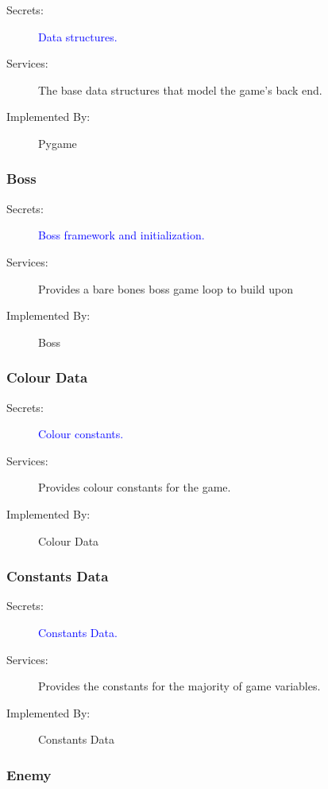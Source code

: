 \documentclass[12pt, titlepage]{article}
\begin{document}
\begin{description}
\item[Secrets:] \textcolor{blue}{Data structures.}
\item[Services:] The base data structures that model the game's back end. 
\item[Implemented By:] Pygame
\end{description}

\subsubsection{Boss}

\begin{description}
  \item[Secrets:] \textcolor{blue}{Boss framework and initialization.}
  \item[Services:] Provides a bare bones boss game loop to build upon
  \item[Implemented By:] Boss
\end{description}

\subsubsection{Colour Data}

\begin{description}
  \item[Secrets:] \textcolor{blue}{Colour constants.}
  \item[Services:] Provides colour constants for the game.
  \item[Implemented By:] Colour Data
\end{description}

\subsubsection{Constants Data}

\begin{description}
  \item[Secrets:] \textcolor{blue}{Constants Data.}
  \item[Services:] Provides the constants for the majority of game variables.
  \item[Implemented By:] Constants Data
\end{description}

\subsubsection{Enemy}
\end{document}
